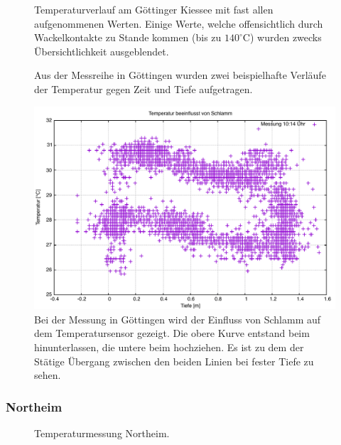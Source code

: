\documentclass[12pt,a4paper,titlepage,headinclude,bibtotoc]{scrartcl}
\numberwithin{equation}{subsection}
\begin{document}
\begin{figure}[h]
\centering

\caption{Temperaturverlauf am Göttinger Kiessee mit fast allen aufgenommenen Werten. Einige Werte, welche offensichtlich durch Wackelkontakte zu Stande kommen (bis zu $140^\circ$C) wurden zwecks Übersichtlichkeit ausgeblendet.}
\label{fig:temp_goe}
\end{figure}

\begin{figure}[!h]
	\centering
   \hfill
	\caption{Aus der Messreihe in Göttingen wurden zwei beispielhafte Verläufe der Temperatur gegen Zeit und Tiefe aufgetragen.}
	\label{fig:tempGoeBsp}
\end{figure}

\begin{figure}[!h]
	\centering
	\includegraphics[width=0.8\linewidth]{TempSchlamm}
	\caption{Bei der Messung in Göttingen wird der Einfluss von Schlamm auf dem Temperatursensor gezeigt. Die obere Kurve entstand beim hinunterlassen, die untere beim hochziehen. Es ist zu dem der Stätige Übergang zwischen den beiden Linien bei fester Tiefe zu sehen.}
	\label{fig:tempSchlamm}
\end{figure}



\subsubsection{Northeim}
\label{sec:austempnortheim}
\begin{figure}[!htb]
	\centering
	\hfill
	\caption{Temperaturmessung Northeim.}
	\label{fig:temp_Nord}
\end{figure}
\end{document}

